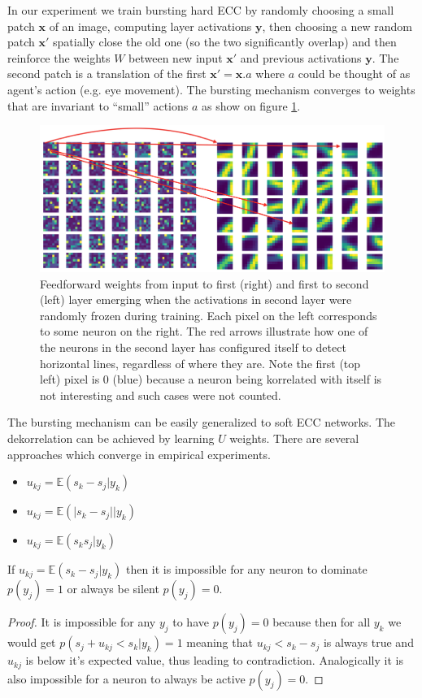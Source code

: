 \documentclass[oneside,english,logo]{amuthesis}
\begin{document}
In our experiment we train bursting hard ECC by randomly choosing a small patch $\boldsymbol{x}$ of an image, computing layer activations $\boldsymbol{y}$, then choosing a new random patch $\boldsymbol{x}'$ spatially close the old one (so the two significantly overlap) and then reinforce the weights $W$ between new input $\boldsymbol{x}'$ and previous activations $\boldsymbol{y}$. The second patch is a translation of the first $\boldsymbol{x}'=\boldsymbol{x}.a$ where $a$ could be thought of as agent's action (e.g. eye movement). The bursting mechanism converges to weights that are invariant to ``small'' actions $a$ as show on figure \ref{fig:motor_drift}. 
\begin{figure}[!htbp]
	\centering
	\includegraphics[width=13.5cm]{motor_drift}
	\caption{Feedforward weights from input to first (right) and first to second (left) layer emerging when the activations in second layer were randomly frozen during training. Each pixel on the left corresponds to some neuron on the right. The red arrows illustrate how one of the neurons in the second layer has configured itself to detect horizontal lines, regardless of where they are. Note the first (top left) pixel is $0$ (blue) because a neuron being korrelated with itself is not interesting and such cases were not counted.}
	\label{fig:motor_drift}
\end{figure} 

The bursting mechanism can be easily generalized to soft ECC networks. The dekorrelation can be achieved by learning $U$ weights. There are several approaches which converge in empirical experiments.
\begin{itemize}
	\item $u_{kj}=\mathbb{E}(s_k-s_j|y_k)$ 
	\item $u_{kj}=\mathbb{E}(\lvert s_k-s_j\rvert  |y_k)$
	\item $u_{kj}=\mathbb{E}( s_k s_j |y_k)$ 
\end{itemize}
\begin{theorem}
	If $u_{kj}=\mathbb{E}(s_k-s_j|y_k)$ then it is impossible for any neuron to dominate $p(y_j)=1$ or always be silent $p(y_j)=0$.
\end{theorem}
\begin{proof}
	It is impossible for any $y_j$ to have $p(y_j)=0$ because then for all $y_k$ we would get
	$p(s_j+u_{kj}<s_k|y_k)=1$ meaning that $u_{kj}<s_k-s_j$ is always true and $u_{kj}$ is below it's expected value, thus leading to contradiction. Analogically it is also impossible for a neuron to always be active  $p(y_j)=0$. 
\end{proof}
\end{document}
